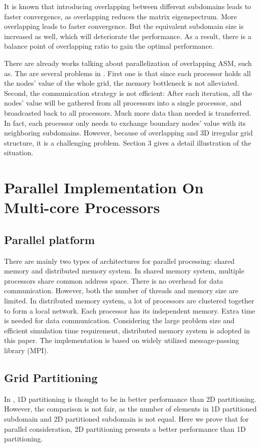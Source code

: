 \documentclass{sig-alternate}
\begin{document}
	It is known that introducing overlapping between different subdomains leads to faster convergence, 
	as overlapping reduces the matrix eigenspectrum\cite{Klawonn, Taopeng}. More overlapping leads to faster convergence.
	But the equivalent subdomain size is increased as well, which will deteriorate the performance. As a result, there is a 
	balance point of overlapping ratio to gain the optimal performance.

	There are already works talking about parallelization of overlapping ASM, such as\cite{kaisun}. The are several problems in 
	\cite{kaisun}. First one is that since each processor holds all the nodes' value of the whole grid, the memory bottleneck
	is not alleviated. Second, the communication strategy is not efficient: After each iteration, all the
	nodes' value will be gathered from all processors into a single processor, and broadcasted back to all processors. Much more
	data than needed is transferred. In fact, each processor only needs to exchange boundary nodes' value with its neighboring 
	subdomains. However, because of overlapping and 3D irregular grid structure, it is a challenging problem. Section 3
	gives a detail illustration of the situation.
 
\section{Parallel Implementation On \\Multi-core Processors}
  \subsection{Parallel platform}
	There are mainly two types of architectures for parallel processing: shared memory and distributed memory system. In shared 
	memory system, 
	multiple processors share common address space. There is no overhead for data communication. However, both the number
	of threads and memory size are limited. In distributed 
	memory system, a lot of processors are clustered together to form a local network. Each processor has its independent memory. 
	Extra time is needed for data communication. Considering the large problem 
	size and efficient simulation time requirement, distributed memory system is adopted in this paper. The implementation is based
	on widely utilized message-passing library (MPI).
  \subsection{Grid Partitioning}
	In \cite{Zhongyu}, 1D partitioning is thought to be in better performance than 2D partitioning. However, the comparison is not 
	fair, as the number of elements in 1D partitioned subdomain and 2D partitioned subdomain is not equal. Here we prove that
	for parallel consideration, 2D partitioning presents a better performance than 1D partitioning. 
\end{document}
